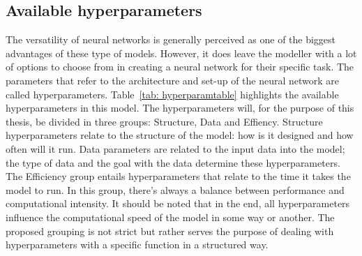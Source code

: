 \documentclass[twocolumn, 10pt, a4paper]{memoir}
\begin{document}
	\subsection{Available hyperparameters} \label{sec: Avail hyper}
	The versatility of neural networks is generally perceived as one of the biggest advantages of these type of models. However, it does leave the modeller with a lot of options to choose from in creating a neural network for their specific task. The parameters that refer to the architecture and set-up of the neural network are called hyperparameters. Table~\ref{tab: hyperparamtable} highlights the available hyperparameters in this model. The hyperparameters will, for the purpose of this thesis, be divided in three groups: Structure, Data and Effiency. Structure hyperparameters relate to the structure of the model: how is it designed and how often will it run. Data parameters are related to the input data into the model; the type of data and the goal with the data determine these hyperparameters. The Efficiency group entails hyperparameters that relate to the time it takes the model to run. In this group, there's always a balance between performance and computational intensity. It should be noted that in the end, all hyperparameters influence the computational speed of the model in some way or another. The proposed grouping is not strict but rather serves the purpose of dealing with hyperparameters with a specific function in a structured way.
	
\end{document}
